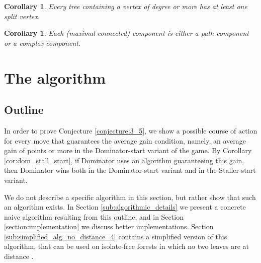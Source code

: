 \documentclass[11pt]{article}
\newtheorem{corollary}[theorem]{Corollary}
\theoremstyle{definition}
\begin{document}
\begin{corollary}
Every tree containing a vertex of degree  or more has at least one split vertex.
\end{corollary}

\begin{corollary}
Each (maximal connected) component is either a path component or a complex component.
\end{corollary}


\section{The algorithm}
\label{section:algorithm_outline}

\subsection{Outline}
\label{sub:alg_outline}

In order to prove Conjecture \ref{conjecture:3_5}, we show a possible course of action for every move that guarantees the average gain condition, namely, an average gain of  points or more in the Dominator-start variant of the game.
By Corollary \ref{cor:dom_stall_start}, if Dominator uses an algorithm guaranteeing this gain, then Dominator wins both in the Dominator-start variant and in the Staller-start variant.

We do not describe a specific algorithm in this section, but rather show that such an algorithm exists.
In Section \ref{sub:algorithmic_details} we present a concrete naive algorithm resulting from this outline, and in Section \ref{section:implementation} we discuss better implementations.
Section \ref{sub:simplified_alg_no_distance_4} contains a simplified version of this algorithm, that can be used on isolate-free forests in which no two leaves are at distance .
\end{document}
